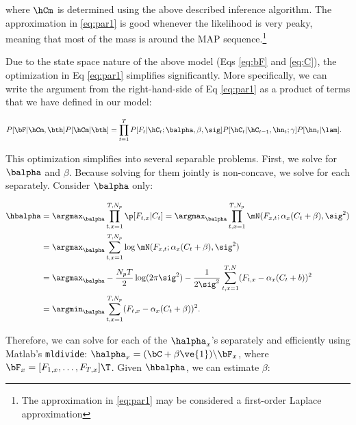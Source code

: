 \noindent where $\hCm$ is determined using the above described inference algorithm. The approximation in \eqref{eq:par1} is good whenever the likelihood is very peaky, meaning that most of the mass is around the MAP sequence.\footnote{The approximation in \eqref{eq:par1} may be considered a first-order Laplace approximation}  

Due to the state space nature of the above model (Eqs \eqref{eq:bF} and \eqref{eq:C}), the optimization in Eq \eqref{eq:par1} simplifies significantly.  More specifically, we can write the argument from the right-hand-side of Eq \eqref{eq:par1} as a product of terms that we have defined in our model:

 \begin{align} \label{eq:par2}
P[\bF| \hCm, \bth] P[\hCm | \bth] &= \prod_{t=1}^T P[F_t | \hC_t; \balpha, \beta,\sig] P[\hC_t | \hC_{t-1}, \hn_t; \gamma] P[\hn_t | \lam].
\end{align}

\noindent This optimization simplifies into several separable problems.  %
First, we solve for $\balpha$ and $\beta$.  Because solving for them jointly is non-concave, we solve for each separately.  Consider $\balpha$ only:

\begin{subequations}
\begin{align}
\hbalpha 
&= \argmax_{\balpha} \prod_{t,x=1}^{T,N_p}  \p[F_{t,x} | C_t] 
=  \argmax_{\balpha} \prod_{t,x=1}^{T,N_p} \mN(F_{x,t}; \alpha_x ( C_t + \beta), \sig^2) \\
&= \argmax_{\balpha} \sum_{t,x=1}^{T,N_p} \log \mN (F_{x,t}; \alpha_x ( C_t + \beta), \sig^2)  \\
&= \argmax_{\balpha}  -\frac{N_p T}{2}\log(2\pi \sig^2) -\frac{1}{2\sig^2}\sum_{t,x=1}^{T,N} (F_{t,x} - \alpha_x(C_t + b))^2 \\
&= \argmin_{\balpha} \sum_{t,x=1}^{T,N_p} (F_{t,x} - \alpha_x(C_t + \beta))^2.
\end{align}
\end{subequations}

Therefore, we can solve for each of the $\halpha_x$'s separately and efficiently using Matlab's  \texttt{mldivide}: 
%
	$\halpha_x = (\bC + \beta\ve{1})\backslash \bF_x$, 
%
where $\bF_x=[F_{1,x}, \ldots, F_{T,x}]\T$. Given $\hbalpha$, we can estimate $\beta$:

